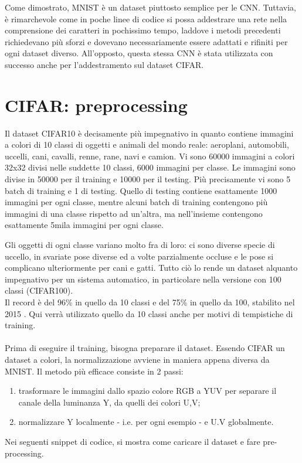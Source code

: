 Come dimostrato, MNIST è un dataset piuttosto semplice per le CNN. Tuttavia, è rimarchevole come in poche linee di codice si possa addestrare una rete nella comprensione dei caratteri in pochissimo tempo, laddove i metodi precedenti richiedevano più sforzi e dovevano necessariamente essere adattati e rifiniti per ogni dataset diverso. All'opposto, questa stessa CNN è stata utilizzata con successo anche per l'addestramento sul dataset CIFAR. 

\section{CIFAR: preprocessing}
Il dataset CIFAR10 è decisamente più impegnativo in quanto contiene immagini a colori di 10 classi di oggetti e animali del mondo reale: aeroplani, automobili, uccelli, cani, cavalli, renne, rane, navi e camion. Vi sono 60000 immagini a colori 32x32 divisi nelle suddette 10 classi, 6000 immagini per classe. Le immagini sono divise in 50000 per il training e 10000 per il testing. Più precisamente vi sono 5 batch di training e 1 di testing. Quello di testing contiene esattamente 1000 immagini per ogni classe, mentre alcuni batch di training contengono più immagini di una classe rispetto ad un’altra, ma nell’insieme contengono esattamente 5mila immagini per ogni classe.

Gli oggetti di ogni classe variano molto fra di loro: ci sono diverse specie di uccello, in svariate pose diverse ed a volte parzialmente occluse e le pose si complicano ulteriormente per cani e gatti. Tutto ciò lo rende un dataset alquanto impegnativo per un sistema automatico, in particolare nella versione con 100 classi (CIFAR100). 
\\
Il record è del 96\% in quello da 10 classi e del 75\% in quello da 100, stabilito nel 2015 \parencite{Wcifar}. Qui verrà utilizzato quello da 10 classi anche per motivi di tempistiche di training. \\
\\
Prima di eseguire il training, bisogna preparare il dataset. Essendo CIFAR un dataset a colori, la normalizzazione avviene in maniera appena diversa da MNIST. Il metodo più efficace consiste in 2 passi: 
\begin{enumerate}
\item trasformare le immagini dallo spazio colore RGB a YUV per separare il canale della luminanza Y, da quelli dei colori U,V; 
\item normalizzare Y localmente - i.e. per ogni esempio - e U.V globalmente.
\end{enumerate} 
Nei seguenti snippet di codice, si mostra come caricare il dataset e fare pre-processing.

